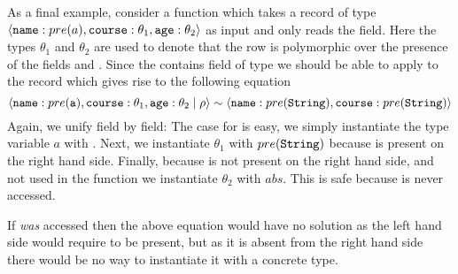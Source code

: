 As a final example, consider a function  which takes a record of type $\langle \texttt{name}:pre(a),\texttt{course}:\theta_1,\texttt{age}:\theta_2 \rangle$ as input and only reads the  field. Here the types $\theta_1$ and $\theta_2$ are used to denote that the row is polymorphic over the presence of the fields  and . Since the  contains field  of type  we should be able to apply  to the record  which gives rise to the following equation
\[ 
\langle \texttt{name}:pre(\texttt{a}),\texttt{course}:\theta_1,\texttt{age}:\theta_2 \; | \; \rho \rangle \sim \langle \texttt{name}:pre(\texttt{String}),\texttt{course}:pre(\texttt{String}) \rangle
\]
Again, we unify field by field: The case for  is easy, we simply instantiate the type variable $a$ with . Next, we instantiate $\theta_1$ with $pre(\texttt{String})$ because  is present on the right hand side. Finally, because  is not present on the right hand side, and not used in the function we instantiate $\theta_2$ with $abs$. This is safe because  is never accessed. 

If  \emph{was} accessed then the above equation would have no solution as the left hand side would require  to be present, but as it is absent from the right hand side there would be no way to instantiate it with a concrete type.
